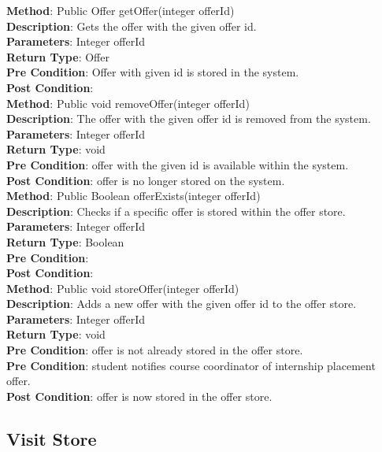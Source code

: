 \documentclass{l3deliverable}
\begin{document}
\textbf{Method}: Public Offer getOffer(integer offerId)\\ 
\textbf{Description}: Gets the offer with the given offer id. \\
\textbf{Parameters}: Integer offerId\\
\textbf{Return Type}: Offer\\
\textbf{Pre Condition}: Offer with given id is stored in the system.\\
\textbf{Post Condition}:\\

\textbf{Method}: Public void removeOffer(integer offerId)\\
\textbf{Description}: The offer with the given offer id is removed from the system. \\
\textbf{Parameters}: Integer offerId \\
\textbf{Return Type}: void\\
\textbf{Pre Condition}: offer with the given id is available within the system.\\
\textbf{Post Condition}: offer is no longer stored on the system.\\

\textbf{Method}: Public Boolean offerExists(integer offerId) \\
\textbf{Description}: Checks if a specific offer is stored within the offer store. \\
\textbf{Parameters}: Integer offerId\\
\textbf{Return Type}: Boolean\\
\textbf{Pre Condition}:\\
\textbf{Post Condition}:\\

\textbf{Method}: Public void storeOffer(integer offerId)\\
\textbf{Description}: Adds a new offer with the given offer id to the offer store. \\
\textbf{Parameters}: Integer offerId\\
\textbf{Return Type}: void\\
\textbf{Pre Condition}: offer is not already stored in the offer store.\\
\textbf{Pre Condition}: student notifies course coordinator of internship placement offer.\\
\textbf{Post Condition}: offer is now stored in the offer store.\\

\subsection{Visit Store}
\end{document}
